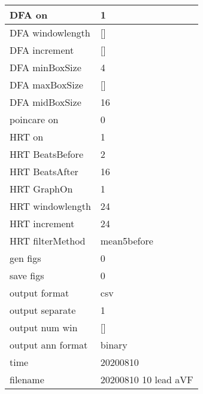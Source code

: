 \begin{tabular}{|l|l|}
DFA on&1\\\hline
DFA windowlength&[]\\\hline
DFA increment&[]\\\hline
DFA minBoxSize&4\\\hline
DFA maxBoxSize&[]\\\hline
DFA midBoxSize&16\\\hline
poincare on&0\\\hline
HRT on&1\\\hline
HRT BeatsBefore&2\\\hline
HRT BeatsAfter&16\\\hline
HRT GraphOn&1\\\hline
HRT windowlength&24\\\hline
HRT increment&24\\\hline
HRT filterMethod&mean5before\\\hline
gen figs&0\\\hline
save figs&0\\\hline
output format&csv\\\hline
output separate&1\\\hline
output num win&[]\\\hline
output ann format&binary\\\hline
time&20200810\\\hline
filename&20200810 10 lead aVF\\\hline
\end{tabular}
